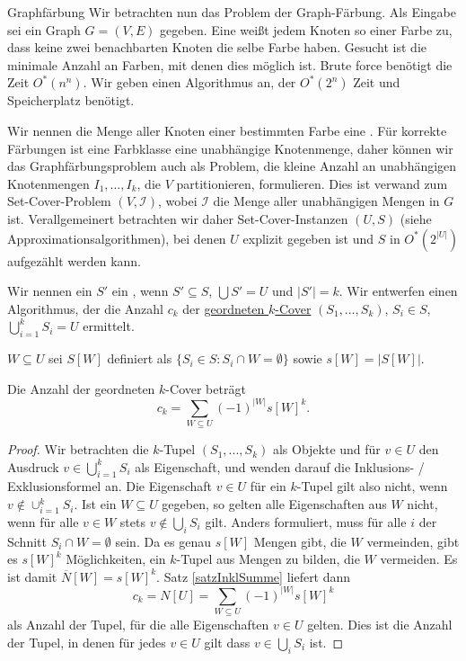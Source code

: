 \begin{section}{Graphfärbung}
  Wir betrachten nun das Problem der Graph-Färbung. Als Eingabe sei ein Graph \(G = (V,E)\) gegeben. Eine  weißt jedem Knoten so einer Farbe zu, dass keine zwei benachbarten Knoten die selbe Farbe haben. Gesucht ist die minimale Anzahl an Farben, mit denen dies möglich ist. Brute force benötigt die Zeit \( O^*(n^n) \). Wir geben einen Algorithmus an, der \(O^*(2^n)\) Zeit und Speicherplatz benötigt.
  
  Wir nennen die Menge aller Knoten einer bestimmten Farbe eine . Für korrekte Färbungen ist eine Farbklasse eine unabhängige Knotenmenge, daher können wir das Graphfärbungsproblem auch als Problem, die kleine Anzahl an unabhängigen Knotenmengen \(I_1,...,I_k\), die \(V\) partitionieren, formulieren. Dies ist verwand zum Set-Cover-Problem $(V, \mathcal{I})$, wobei \(\mathcal{I}\) die Menge aller unabhängigen Mengen in $G$ ist. Verallgemeinert betrachten wir daher Set-Cover-Instanzen $(U,S)$ (siehe Approximationsalgorithmen), bei denen $U$ explizit gegeben ist und $S$ in $O^*(2^{|U|})$ aufgezählt werden kann. 
  
  Wir nennen ein $S'$ ein , wenn $S' \subseteq S$, $\bigcup S' = U$ und $|S'| = k$. Wir entwerfen einen Algorithmus, der die Anzahl $c_k$ der \underline{geordneten $k$-Cover} $(S_1,\dots,S_k)$, $S_i \in S$, $\bigcup_{i=1}^k S_i = U$ ermittelt.
  
  \(W \subseteq U\) sei \(S[W]\) definiert als \( \{ S_i \in S : S_i \cap W = \emptyset \} \) sowie \(s[W] = |S[W]|\).
  
  \begin{lemma}
   Die Anzahl der geordneten $k$-Cover beträgt 
   \[c_k = \sum_{W \subseteq U} (-1)^{ |W| } s[W]^k\text{.}\]
  \end{lemma}

  \begin{proof}
    Wir betrachten die \(k\)-Tupel \( (S_1, ..., S_k) \) als Objekte und für \(v \in U\) den Ausdruck \(v \in \bigcup_{i=1}^k S_i\) als Eigenschaft, und wenden darauf die Inklusions- / Exklusionsformel an. Die Eigenschaft \(v \in U\) für ein \(k\)-Tupel gilt also nicht, wenn \(v \notin \cup_{i=1}^k S_i\). Ist ein \(W \subseteq U\) gegeben, so gelten alle Eigenschaften aus \(W\) nicht, wenn für alle \(v \in W\) stets \(v \notin \bigcup_i S_i\) gilt. Anders formuliert, muss für alle \(i\) der Schnitt \(S_i \cap W = \emptyset\) sein. Da es genau \(s[W]\) Mengen gibt, die \(W\) vermeinden, gibt es \(s[W]^k\) Möglichkeiten, ein \(k\)-Tupel aus Mengen zu bilden, die \(W\) vermeiden. Es ist damit \( \overline{N}[W] = s[W]^k\). Satz \ref{satzInklSumme} liefert dann \[c_k = N[U] = \sum_{W \subseteq U} (-1)^{ |W| } s[W]^k\] als Anzahl der Tupel, für die alle Eigenschaften \(v \in U\) gelten. Dies ist die Anzahl der Tupel, in denen für jedes \(v \in U\) gilt dass \(v \in \bigcup_i S_i\) ist.
  \end{proof}


\end{section}
